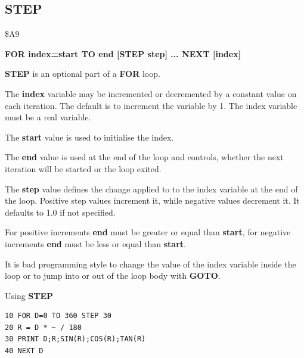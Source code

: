 
\newpage
\subsection{STEP}
\begin{description}[leftmargin=2cm,style=nextline]
\item [Token:] \$A9
\item [Format:] {\bf FOR index=start TO end [STEP step] ... NEXT [index]}
\item [Usage:] {\bf STEP} is an optional part of a
               {\bf FOR} loop.

               The {\bf index} variable may be incremented or decremented
               by a constant value on each iteration. The default
               is to increment the variable by 1.
               The index variable must be a real variable.

               The {\bf start} value is used to initialise the index.

               The {\bf end} value is used at the end of the loop
               and controls, whether the next iteration will be started
               or the loop exited.

               The {\bf step} value defines the change applied to
               to the index variable at the end of the loop.
               Positive step values increment it, while negative values
               decrement it. It defaults to 1.0 if not specified.

\item [Remarks:] For positive increments {\bf end} must be greater
               or equal than {\bf start}, for negative increments
               {\bf end} must be less or equal than {\bf start}.

               It is bad programming style to change the value
               of the index variable inside the loop or to
               jump into or out of the loop body with {\bf GOTO}.

\item [Example:] Using {\bf STEP}
\begin{tcolorbox}[colback=black,coltext=white]
\verbatimfont{\codefont}
\begin{verbatim}
10 FOR D=0 TO 360 STEP 30
20 R = D * ~ / 180
30 PRINT D;R;SIN(R);COS(R);TAN(R)
40 NEXT D
\end{verbatim}
\end{tcolorbox}
\end{description}

